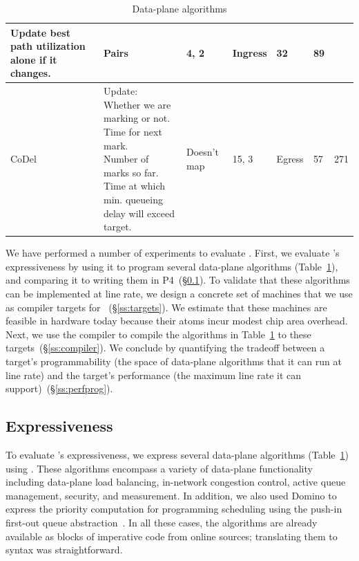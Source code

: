 \begin{table}[!t]
\begin{tabular}{|p{}|p{}|p{}|p{}|p{}|p{}|p{}|}
{                                           Update best path utilization alone if it changes.}  & Pairs & 4, 2 & Ingress & 32 & 89\\
\hline
CoDel~\cite{codel} & \pbox{0.34\textwidth}{Update:\\Whether we are marking or not.\\Time for next mark.\\Number of marks so far.\\Time at which min. queueing delay will exceed target.}& Doesn't map & 15, 3 & Egress & 57 & 271\\
\hline
\end{tabular}
\caption{Data-plane algorithms}
\label{tab:algos}
\end{table}

We have performed a number of experiments to evaluate \pktlanguage. 
First, we evaluate \pktlanguage's expressiveness by using it to program several
data-plane algorithms (Table~\ref{tab:algos}), and comparing it to writing them
in P4~(\S\ref{ss:expressiveness}).  To validate that these algorithms can be
implemented at line rate, we design a concrete set of \absmachine machines that
we use as compiler targets for \pktlanguage~(\S\ref{ss:targets}).  We estimate
that these machines are feasible in hardware today because their atoms incur
modest chip area overhead. Next, we use the \pktlanguage compiler to compile
the algorithms in Table~\ref{tab:algos} to these targets~(\S\ref{ss:compiler}).
We conclude by quantifying the tradeoff between a target's programmability (the
space of data-plane algorithms that it can run at line rate) and the target's
performance (the maximum line rate it can support)~(\S\ref{ss:perfprog}).

\subsection{Expressiveness}
\label{ss:expressiveness}

To evaluate \pktlanguage's expressiveness, we express several data-plane
algorithms (Table~\ref{tab:algos}) using \pktlanguage. These algorithms
encompass a variety of data-plane functionality including data-plane load
balancing, in-network congestion control, active queue management, security,
and measurement. In addition, we also used Domino to express the priority
computation for programming scheduling using the push-in first-out queue
abstraction~\cite{pifo_hotnets}. In all these cases, the algorithms are
already available as blocks of imperative code from online sources; 
translating them to \pktlanguage syntax
was straightforward.

